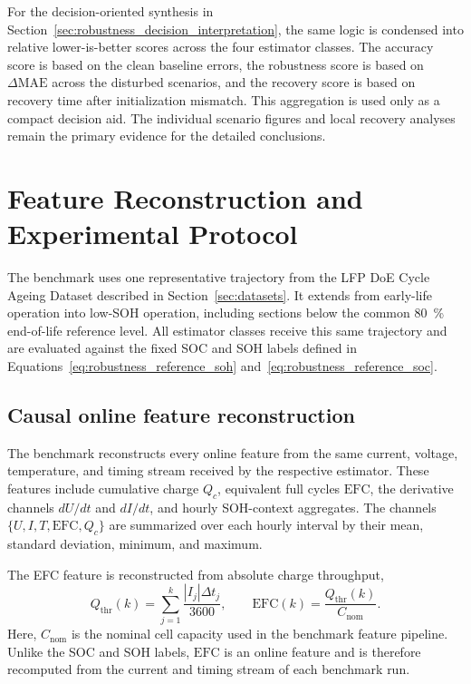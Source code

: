 \documentclass[
    a4paper,
    12pt,
    titlepage,
    bibliography=totoc,
    twoside=on,
    parskip=false,
    numbers=noenddot,
    cleardoublepage=empty,
    DIV=12,
    BCOR=12.0mm,
    headheight=36pt,
    headings=openright
]{scrreprt}
\begin{document}
For the decision-oriented synthesis in Section~\ref{sec:robustness_decision_interpretation}, the same logic is condensed into relative lower-is-better scores across the four estimator classes. The accuracy score is based on the clean baseline errors, the robustness score is based on $\Delta\mathrm{MAE}$ across the disturbed scenarios, and the recovery score is based on recovery time after initialization mismatch. This aggregation is used only as a compact decision aid. The individual scenario figures and local recovery analyses remain the primary evidence for the detailed conclusions.

\section{Feature Reconstruction and Experimental Protocol}
The benchmark uses one representative trajectory from the LFP DoE Cycle Ageing Dataset described in Section~\ref{sec:datasets}.\autocite{lfpDoeCycleAgingDataset2025} It extends from early-life operation into low-SOH operation, including sections below the common \SI{80}{\percent} end-of-life reference level. All estimator classes receive this same trajectory and are evaluated against the fixed SOC and SOH labels defined in Equations~\ref{eq:robustness_reference_soh} and~\ref{eq:robustness_reference_soc}.

\subsection{Causal online feature reconstruction}
The benchmark reconstructs every online feature from the same current, voltage, temperature, and timing stream received by the respective estimator. These features include cumulative charge $Q_c$, equivalent full cycles $\mathrm{EFC}$, the derivative channels $dU/dt$ and $dI/dt$, and hourly SOH-context aggregates. The channels $\{U,I,T,\mathrm{EFC},Q_c\}$ are summarized over each hourly interval by their mean, standard deviation, minimum, and maximum.

The EFC feature is reconstructed from absolute charge throughput,
\begin{equation}
    Q_{\mathrm{thr}}(k)=\sum_{j=1}^{k}\frac{|I_j|\Delta t_j}{3600},
    \qquad
    \mathrm{EFC}(k)=\frac{Q_{\mathrm{thr}}(k)}{C_{\mathrm{nom}}}.
    \label{eq:robustness_efc}
\end{equation}
Here, $C_{\mathrm{nom}}$ is the nominal cell capacity used in the benchmark feature pipeline. Unlike the SOC and SOH labels, $\mathrm{EFC}$ is an online feature and is therefore recomputed from the current and timing stream of each benchmark run.
\end{document}
